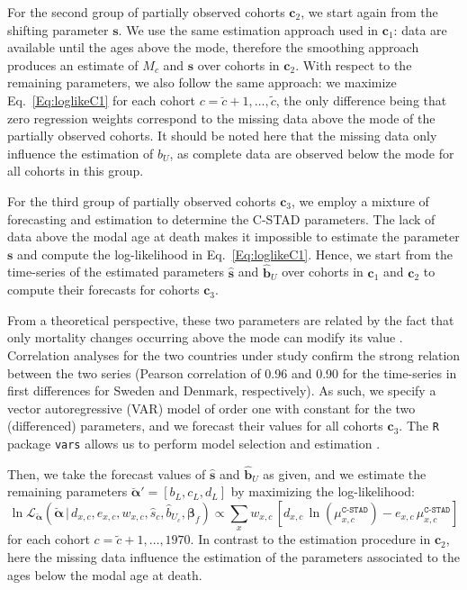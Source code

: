 \documentclass[11pt, a4paper]{article}
\begin{document}
For the second group of partially observed cohorts $\bm{c}_2$, we start again from the shifting parameter $\bm{s}$. We use the same estimation approach used in $\bm{c}_1$: data are available until the ages above the mode, therefore the smoothing approach produces an estimate of $M_c$ and $\hat{\bm{s}}$ over cohorts in $\bm{c}_2$. With respect to the remaining parameters, we also follow the same approach: we maximize Eq.~\eqref{Eq:loglikeC1} for each cohort $c=\breve{c}+1,\ldots,\tilde{c}$, the only difference being that zero regression weights correspond to the missing data above the mode of the partially observed cohorts. It should be noted here that the missing data only influence the estimation of $b_U$, as complete data are observed below the mode for all cohorts in this group. 

For the third group of partially observed cohorts $\bm{c}_3$, we employ a mixture of forecasting and estimation to determine the C-STAD parameters. The lack of data above the modal age at death makes it impossible to estimate the parameter $\bm{s}$ and compute the log-likelihood in Eq.~\eqref{Eq:loglikeC1}. Hence, we start from the time-series of the estimated parameters $\hat{\bm{s}}$ and $\hat{\bm{b}}_U$ over cohorts in $\bm{c}_1$ and $\bm{c}_2$ to compute their forecasts for cohorts $\bm{c}_3$. 

From a theoretical perspective, these two parameters are related by the fact that only mortality changes occurring above the mode can modify its value \cite[cf.~Appendix B in][]{canudas2010three}. Correlation analyses for the two countries under study confirm the strong relation between the two series (Pearson correlation of 0.96 and 0.90 for the time-series in first differences for Sweden and Denmark, respectively). As such, we specify a vector autoregressive (VAR) model of order one with constant for the two (differenced) parameters, and we forecast their values for all cohorts $\bm{c}_3$. The \texttt{R} package \texttt{vars} allows us to perform model selection and estimation \citep{pfaff2008analysis,pfaff2008var}.

Then, we take the forecast values of $\hat{\bm{s}}$ and $\hat{\bm{b}}_U$ as given, and we estimate the remaining parameters $\breve{\bm{\alpha}}'=\left[b_{L},c_{L},d_{L}\right]$ by maximizing the log-likelihood:
%
\begin{equation}\label{Eq:loglikeC3}
\ln\mathcal{L}_{\breve{\bm{\alpha}}}\left(\breve{\bm{\alpha}}\,|\,d_{x,c} , e_{x,c} , w_{x,c} , \hat{s}_{c}, \hat{b}_{U_{c}} , \bm{\beta}_{f} \right) \propto  \sum_{x} w_{x,c} \, \left[  d_{x,c} \,
\ln \left( \mu^{\texttt{C-STAD}}_{x,c}  \right) - e_{x,c}
\, \mu^{\texttt{C-STAD}}_{x,c} \right] 
\end{equation}
%
for each cohort $c=\tilde{c}+1,\ldots,1970$. In contrast to the estimation procedure in $\bm{c}_2$, here the missing data influence the estimation of the parameters associated to the ages below the modal age at death. \par
\end{document}
